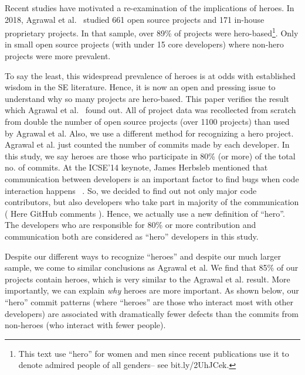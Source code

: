 \documentclass[sigconf,review]{acmart}
\begin{document}
Recent studies have motivated a re-examination of the implications of heroes.
In 2018,  Agrawal et al.~\cite{Agrawal_2018} studied
 661 open source projects and  171 in-house
 proprietary projects.
 In that sample, over 89\% of projects were hero-based\footnote{This text    use ``hero'' for   women and men since recent publications
 use it to denote admired people of all genders-- see bit.ly/2UhJCek.}. 
Only in small open source projects (with under 15 core developers) 
where non-hero projects were more prevalent. 
  
 

To say the least, this widespread prevalence of heroes is  at odds with established
wisdom in the SE literature\cite{bier2011online,boehm2006view,hislop2002integrating,morcovcomplex,wood2005multiview,ricca2010heroes,robles2006contributor,capiluppi2007adapting}.
Hence, it is now   an open and pressing issue to understand why so many projects are hero-based.
This paper verifies the result which Agrawal et al.~\cite{Agrawal_2018} found out.
All of project data was recollected from scratch from  double the number of open source projects (over 1100   projects) than  used by Agrawal et al.
Also,
we use a different method for recognizing a hero project.   Agrawal et al. just counted the number
of commits made by each developer. In this study, we say heroes are those who participate in 80\% (or more) of the total no. of commits. At the ICSE'14 keynote,
James Herbsleb mentioned that communication between developers is an important factor to find bugs when code interaction happens ~\cite{Herbsleb:2014}. So, we decided to find out not only major code contributors, but also developers who take part in majority of the communication ( Here GitHub comments ). Hence, we actually use a new definition of ``hero''. The developers who are responsible for 80\% or more contribution and communication both are considered as ``hero'' developers in this study. 

Despite our different ways to recognize ``heroes'' and despite our much larger sample, we come to
similar conclusions as   Agrawal et al. We find that 85\% of our projects contain heroes, which is very similar
to the Agrawal et al. result. More importantly, we can explain {\em why} heroes are more important. As shown below,
our ``hero'' commit patterns (where ``heroes'' are those who interact most with other developers) are
associated with dramatically fewer defects than the commits from non-heroes (who interact with  fewer people).
\end{document}
